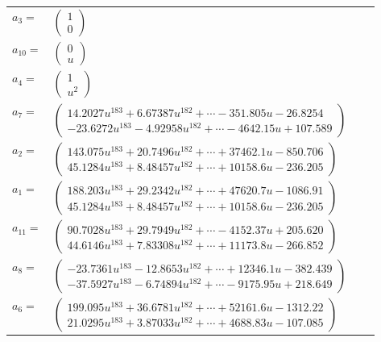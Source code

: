 \documentclass[1p]{elsarticle_modified}
\theoremstyle{definition}
\begin{document}
\begin{tabular}{m{7pt} m{180pt} m{7pt} m{180pt} }
\flushright $a_{3}=$&$\begin{pmatrix}1\\0\end{pmatrix}$ \\
\flushright $a_{10}=$&$\begin{pmatrix}0\\u\end{pmatrix}$ \\
\flushright $a_{4}=$&$\begin{pmatrix}1\\u^2\end{pmatrix}$ \\
\flushright $a_{7}=$&$\begin{pmatrix}14.2027 u^{183}+6.67387 u^{182}+\cdots-351.805 u-26.8254\\-23.6272 u^{183}-4.92958 u^{182}+\cdots-4642.15 u+107.589\end{pmatrix}$ \\
\flushright $a_{2}=$&$\begin{pmatrix}143.075 u^{183}+20.7496 u^{182}+\cdots+37462.1 u-850.706\\45.1284 u^{183}+8.48457 u^{182}+\cdots+10158.6 u-236.205\end{pmatrix}$ \\
\flushright $a_{1}=$&$\begin{pmatrix}188.203 u^{183}+29.2342 u^{182}+\cdots+47620.7 u-1086.91\\45.1284 u^{183}+8.48457 u^{182}+\cdots+10158.6 u-236.205\end{pmatrix}$ \\
\flushright $a_{11}=$&$\begin{pmatrix}90.7028 u^{183}+29.7949 u^{182}+\cdots-4152.37 u+205.620\\44.6146 u^{183}+7.83308 u^{182}+\cdots+11173.8 u-266.852\end{pmatrix}$ \\
\flushright $a_{8}=$&$\begin{pmatrix}-23.7361 u^{183}-12.8653 u^{182}+\cdots+12346.1 u-382.439\\-37.5927 u^{183}-6.74894 u^{182}+\cdots-9175.95 u+218.649\end{pmatrix}$ \\
\flushright $a_{6}=$&$\begin{pmatrix}199.095 u^{183}+36.6781 u^{182}+\cdots+52161.6 u-1312.22\\21.0295 u^{183}+3.87033 u^{182}+\cdots+4688.83 u-107.085\end{pmatrix}$ \\

\end{tabular}
\end{document}
